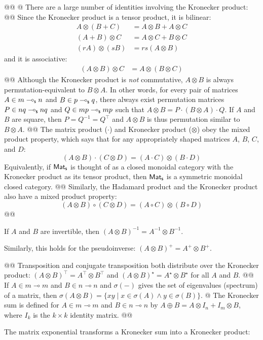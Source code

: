 \documentclass[]{article}
\newcommand{\textbs}[1]{{\sffamily\fontseries{sbc}\selectfont #1}}
\newcommand{\mathbs}[1]{\ensuremath{\text{\textbs{#1}}}}
\newcommand{\mbs}[1]{\ensuremath{\mathbs{#1}}}     %
\newcommand{\msf}[1]{\ensuremath{\mathsf{#1}}}     %
\newcommand{\define}[1]{\textbs{#1}}
\begin{document}
\begin{easylist}[itemize]
{}
@@ {%
}
@ There are a large number of identities involving the Kronecker product:
@@ {%
  Since the Kronecker product is a tensor product, it is bilinear:
  \begin{align*}
    A \otimes (B + C)       & = A \otimes B + A \otimes C \\
    (A + B) \otimes C       & = A \otimes C + B \otimes C \\
    (r A) \otimes (s B)     & = r s (A \otimes B)
  \end{align*}
  and it is associative:
  \begin{align*}
    (A \otimes B) \otimes C & = A \otimes (B \otimes C)
  \end{align*}
  \vspace{-2em}
}
@@ {%
  Although the Kronecker product is \textit{not} commutative, $A \otimes B$
  is always permutation-equivalent to $B \otimes A$.
  In other words, for every pair of matrices $A \in m \multimap_\mbs{s} n$
  and $B \in p \multimap_\mbs{s} q$, there always exist permutation matrices
  $P \in n q \multimap_\mbs{s} n q$ and $Q \in m p \multimap_\mbs{s} m p$
  such that $A \otimes B = P \cdot (B \otimes A) \cdot Q$. If $A$ and $B$ are
  square, then $P = Q^{-1} = Q^\top$ and $A \otimes B$ is thus permutation
  similar to $B \otimes A$.
}
@@ {%
  The matrix product ($\cdot$) and Kronecker product ($\otimes$) obey the
  \define{mixed product property}, which says that for any appropriately
  shaped matrices $A$, $B$, $C$, and $D$:
  \begin{equation*}
  (A \otimes B) \cdot (C \otimes D) = (A \cdot C) \otimes (B \cdot D)
  \end{equation*}
  Equivalently, if $\msf{Mat}_\mbs{s}$ is thought of as a closed monoidal
  category with the Kronecker product as its tensor product, then
  $\msf{Mat}_\mbs{s}$ is a symmetric monoidal closed category.
}
@@ {%
  Similarly, the Hadamard product and the Kronecker product also have a mixed
  product property:
  \begin{equation*}
  (A \otimes B) \circ (C \otimes D) = (A \circ C) \otimes (B \circ D)
  \end{equation*}
}
@@ {%
  If $A$ and $B$ are invertible, then $(A \otimes B)^{-1} = A^{-1} \otimes B^{-1}$.

  Similarly, this holds for the pseudoinverse:
  $(A \otimes B)^{+} = A^{+} \otimes B^{+}$.
}
@@ {%
  Transposition and conjugate transposition both distribute over the Kronecker
  product: ${(A \otimes B)}^{\top} = A^\top \otimes B^\top$ and
  ${(A \otimes B)}^{\star} = A^\star \otimes B^\star$ for all $A$ and $B$.
}
@@ {%
  If $A \in m \multimap m$ and $B \in n \multimap n$ and $\sigma(-)$ gives the
  set of eigenvalues (spectrum) of a matrix, then
  $\sigma(A \otimes B) = \{xy \mid x \in \sigma(A) \land y \in \sigma(B)\}$.
}
@ {%
  The \define{Kronecker sum} is defined for $A \in m \multimap m$ and
  $B \in n \multimap n$ by $A \oplus B = A \otimes I_n + I_m \otimes B$,
  where $I_k$ is the $k \times k$ identity matrix.
}
@@ {%
  The matrix exponential transforms a Kronecker sum into a Kronecker product:

}
\end{easylist}
\end{document}
